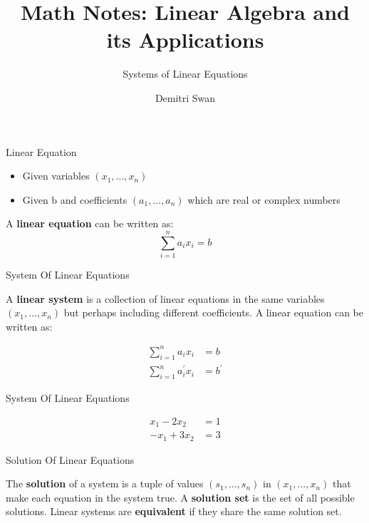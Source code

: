 \documentclass{beamer}
\title{Math Notes: Linear Algebra and its Applications}
\subtitle[short subtitle]{Systems of Linear Equations}
\author{Demitri Swan}
\date{}
\begin{document}
\begin{frame}
  \titlepage
\end{frame}

\begin{frame}{Linear Equation}
  \begin{definition}
  \begin{itemize}
    \item Given variables $\left(x_{1}, ... , x_{n}\right)$\\
    \item Given b and coefficients $\left(a_{1}, ... ,a_{n}\right)$ which are real or complex numbers\\
  \end{itemize}

  A \textbf{linear equation} can be written as:
  \begin{equation}
    \sum_{i=1}^{n} a_{i}x_{i} = b
  \end{equation}
  \end{definition}
\end{frame}

\begin{frame}{System Of Linear Equations}
  \begin{definition}
    A \textbf{linear system} is a collection of linear equations in the same variables $\left(x_{1}, ... ,x_{n}\right)$ 
    but perhaps including different coefficients. A linear equation can be written as:

    \begin{align*}
      \sum_{i=1}^{n} a_{i}x_{i} &= b \\
      \sum_{i=1}^{n} a^{\prime}_{i}x_{i} &= b^{\prime}
    \end{align*}
  \end{definition}
\end{frame}

\begin{frame}{System Of Linear Equations}
  \begin{example}
    \begin{align*}
      x_{1} - 2x_{2} &= 1 \\
      -x_{1} + 3x_{2} &= 3
    \end{align*}
  \end{example}
\end{frame}

\begin{frame}{Solution Of Linear Equations}
  \begin{definition}
    The \textbf{solution} of a system is a tuple of values $\left(s_{1}, ... , s_{n}\right)$ in $\left(x_{1}, ... ,x_{n}\right)$ 
    that make each equation in the system true. A \textbf{solution set} is the set of all possible solutions. 
    Linear systems are \textbf{equivalent} if they share the same solution set.
  \end{definition}
\end{frame}
\end{document}
